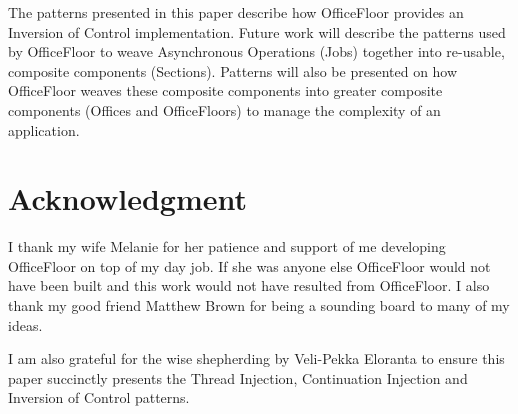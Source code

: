 \documentclass[prodmode]{style/acmlarge}
\begin{document}
The patterns presented in this paper describe how OfficeFloor \cite{officefloor}
provides an Inversion of Control implementation.  Future work will describe the
patterns used by OfficeFloor to weave Asynchronous Operations (Jobs) together
into re-usable, composite components (Sections).  Patterns will also be
presented on how OfficeFloor weaves these composite components into greater
composite components (Offices and OfficeFloors) to manage the complexity of an
application.



\section*{Acknowledgment} I thank my wife Melanie for her patience and support
of me developing OfficeFloor on top of my day job.  If she was anyone else
OfficeFloor would not have been built and this work would not have resulted from
OfficeFloor.  I also thank my good friend Matthew Brown for being a sounding
board to many of my ideas.

I am also grateful for the wise shepherding by Veli-Pekka Eloranta to ensure
this paper succinctly presents the Thread Injection, Continuation Injection and
Inversion of Control patterns.




\end{document}

